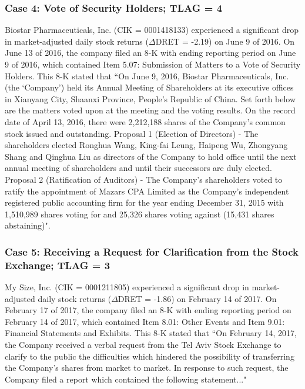 \begin{small}
\subsubsection*{Case 4: Vote of Security Holders; TLAG = 4}
Biostar Pharmaceuticals, Inc. (CIK = 0001418133) experienced a significant drop in market-adjusted daily stock returns ($\Delta$DRET = -2.19) on June 9 of 2016. On June 13 of 2016, the company filed an 8-K with ending reporting period on June 9 of 2016, which contained Item 5.07: Submission of Matters to a Vote of Security Holders. This 8-K stated that ``On June 9, 2016, Biostar Pharmaceuticals, Inc. (the `Company') held its Annual Meeting of Shareholders at its executive offices in Xianyang City, Shaanxi Province, People's Republic of China. Set forth below are the matters voted upon at the meeting and the voting results. On the record date of April 13, 2016, there were 2,212,188 shares of the Company's common stock issued and outstanding. Proposal 1 (Election of Directors) - The shareholders elected Ronghua Wang, King-fai Leung, Haipeng Wu, Zhongyang Shang and Qinghua Liu as directors of the Company to hold office until the next annual meeting of shareholders and until their successors are duly elected. Proposal 2 (Ratification of Auditors) - The Company's shareholders voted to ratify the appointment of Mazars CPA Limited as the Company's independent registered public accounting firm for the year ending December 31, 2015 with 1,510,989 shares voting for and 25,326 shares voting against (15,431 shares abstaining)".
\subsubsection*{Case 5: Receiving a Request for Clarification from the Stock Exchange; TLAG = 3}
My Size, Inc. (CIK = 0001211805) experienced a significant drop in market-adjusted daily stock returns ($\Delta$DRET = -1.86) on February 14 of 2017. On February 17 of 2017, the company filed an 8-K with ending reporting period on February 14 of 2017, which contained Item 8.01: Other Events and Item 9.01: Financial Statements and Exhibits. This 8-K stated that ``On February 14, 2017, the Company received a verbal request from the Tel Aviv Stock Exchange to clarify to the public the difficulties which hindered the possibility of transferring the Company's shares from market to market. In response to such request, the Company filed a report which contained the following statement..."
\end{small}